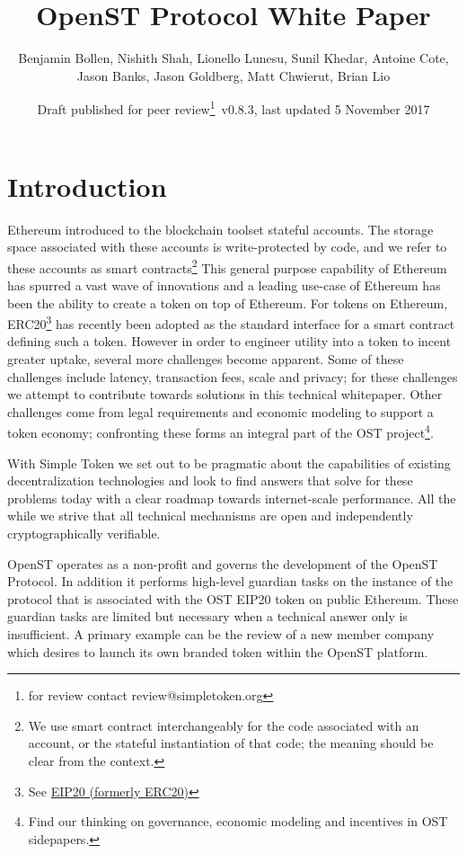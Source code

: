 \documentclass[12pt,a4paper, twocolumn]{article}
\title{{\sc OpenST Protocol White Paper}}
\author{Benjamin Bollen, Nishith Shah, Lionello Lunesu, Sunil Khedar, Antoine Cote,\\ Jason Banks, Jason Goldberg, Matt Chwierut, Brian Lio}
\date{Draft published for peer review\footnote{for review contact review@simpletoken.org}\, v0.8.3, last updated 5 November 2017}
\begin{document}
\maketitle

\section{Introduction}
Ethereum introduced to the blockchain toolset stateful accounts. The storage space associated with these accounts is write-protected by code, and we refer to these accounts as smart contracts\footnote{We use smart contract interchangeably for the code associated with an account, or the stateful instantiation of that code; the meaning should be clear from the context.} This general purpose capability of Ethereum has spurred a vast wave of innovations and a leading use-case of Ethereum has been the ability to create a token on top of Ethereum. For tokens on Ethereum, ERC20\footnote{See \href{https://github.com/ethereum/EIPs/blob/master/EIPS/eip-20.md}{EIP20 (formerly ERC20)}} has recently been adopted as the standard interface for a smart contract defining such a token.  However in order to engineer utility into a token to incent greater uptake, several more challenges become apparent.  Some of these challenges include latency, transaction fees, scale and privacy; for these challenges we attempt to contribute towards solutions in this technical whitepaper.  Other challenges come from legal requirements and economic modeling to support a token economy; confronting these forms an integral part of the OST project\footnote{Find our thinking on governance, economic modeling and incentives in OST sidepapers.}. \par
With Simple Token we set out to be pragmatic about the capabilities of existing decentralization technologies and look to find answers that solve for these problems today with a clear roadmap towards internet-scale performance.  All the while we strive that all technical mechanisms are open and independently cryptographically verifiable. \par
OpenST operates as a non-profit and governs the development of the OpenST Protocol.  In addition it performs high-level guardian tasks on the instance of the protocol that is associated with the OST EIP20 token on public Ethereum.  These guardian tasks are limited but necessary when a technical answer only is insufficient.  A primary example can be the review of a new member company which desires to launch its own branded token within the OpenST platform. \par
\end{document}
